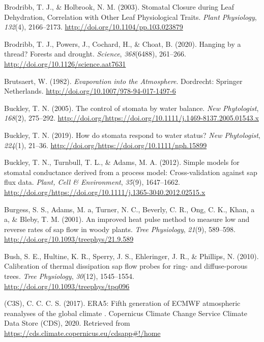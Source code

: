 \documentclass[11pt,twoside]{reedthesis}
\begin{document}
\hypertarget{ref-brodribb_stomatal_2003}{}
Brodribb, T. J., \& Holbrook, N. M. (2003). Stomatal Closure during Leaf
Dehydration, Correlation with Other Leaf Physiological Traits.
\emph{Plant Physiology}, \emph{132}(4), 2166--2173.
\url{http://doi.org/10.1104/pp.103.023879}

\hypertarget{ref-Brodribb2020}{}
Brodribb, T. J., Powers, J., Cochard, H., \& Choat, B. (2020). Hanging
by a thread? Forests and drought. \emph{Science}, \emph{368}(6488),
261--266. \url{http://doi.org/10.1126/science.aat7631}

\hypertarget{ref-brutsaert_evaporation_1982}{}
Brutsaert, W. (1982). \emph{Evaporation into the Atmosphere}. Dordrecht:
Springer Netherlands. \url{http://doi.org/10.1007/978-94-017-1497-6}

\hypertarget{ref-Buckley2005}{}
Buckley, T. N. (2005). The control of stomata by water balance.
\emph{New Phytologist}, \emph{168}(2), 275--292.
\url{http://doi.org/https://doi.org/10.1111/j.1469-8137.2005.01543.x}

\hypertarget{ref-Buckley2019}{}
Buckley, T. N. (2019). How do stomata respond to water status? \emph{New
Phytologist}, \emph{224}(1), 21--36.
\url{http://doi.org/https://doi.org/10.1111/nph.15899}

\hypertarget{ref-Buckley2012}{}
Buckley, T. N., Turnbull, T. L., \& Adams, M. A. (2012). Simple models
for stomatal conductance derived from a process model: Cross-validation
against sap flux data. \emph{Plant, Cell \& Environment}, \emph{35}(9),
1647--1662.
\url{http://doi.org/https://doi.org/10.1111/j.1365-3040.2012.02515.x}

\hypertarget{ref-Burgess2001}{}
Burgess, S. S., Adams, M. a, Turner, N. C., Beverly, C. R., Ong, C. K.,
Khan, a a, \& Bleby, T. M. (2001). An improved heat pulse method to
measure low and reverse rates of sap flow in woody plants. \emph{Tree
Physiology}, \emph{21}(9), 589--598.
\url{http://doi.org/10.1093/treephys/21.9.589}

\hypertarget{ref-Bush2010}{}
Bush, S. E., Hultine, K. R., Sperry, J. S., Ehleringer, J. R., \&
Phillips, N. (2010). Calibration of thermal dissipation sap flow probes
for ring- and diffuse-porous trees. \emph{Tree Physiology},
\emph{30}(12), 1545--1554. \url{http://doi.org/10.1093/treephys/tpq096}

\hypertarget{ref-copernicus_climate_change_service_c3s_era5_2017}{}
(C3S), C. C. C. S. (2017). ERA5: Fifth generation of ECMWF atmospheric
reanalyses of the global climate . Copernicus Climate Change Service
Climate Data Store (CDS), 2020. Retrieved from
\url{https://cds.climate.copernicus.eu/cdsapp\#!/home}
\end{document}

